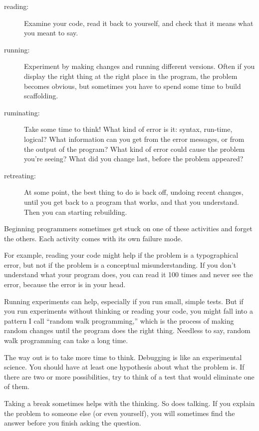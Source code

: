 \documentclass[
]{book}
\begin{document}
\begin{description}

\item[reading:] Examine your code, read it back to yourself, and
check that it means what you meant to say.

\item[running:] Experiment by making changes and running different
versions.  Often if you display the right thing at the right place
in the program, the problem becomes obvious, but sometimes you have to
spend some time to build scaffolding.

\item[ruminating:] Take some time to think!  What kind of error
is it: syntax, run-time, logical?  What information can you get from
the error messages, or from the output of the program?  What kind of
error could cause the problem you're seeing?  What did you change
last, before the problem appeared?

\item[retreating:] At some point, the best thing to do is back
off, undoing recent changes, until you get back to a program that
works, and that you understand.  Then you can starting rebuilding.

\end{description}

Beginning programmers sometimes get stuck on one of these activities
and forget the others.  Each activity comes with its own failure
mode.

For example, reading your code might help if the problem is a
typographical error, but not if the problem is a conceptual
misunderstanding.  If you don't understand what your program does, you
can read it 100 times and never see the error, because the error is in
your head.

Running experiments can help, especially if you run small, simple
tests.  But if you run experiments without thinking or reading your
code, you might fall into a pattern I call ``random walk programming,''
which is the process of making random changes until the program
does the right thing.  Needless to say, random walk programming
can take a long time.

The way out is to take more time to think.  Debugging is like an
experimental science.  You should have at least one hypothesis about
what the problem is.  If there are two or more possibilities, try to
think of a test that would eliminate one of them.

Taking a break sometimes helps with the thinking.  So does talking.
If you explain the problem to someone else (or even yourself), you
will sometimes find the answer before you finish asking the question.
\end{document}
